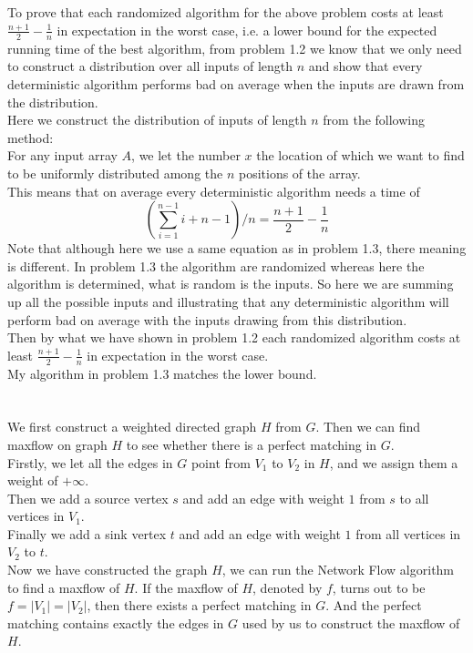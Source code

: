 \documentclass[12pt,letterpaper]{article}
\begin{document}
\subsection{}
To prove that each randomized algorithm for the above problem
costs at least $\frac{n+1}{2}-\frac{1}{n}$ in expectation in the worst case, 
i.e. a lower bound for the expected running time of the best algorithm,
from problem 1.2 we know that we only need to construct a distribution 
over all inputs of length $n$ and show that every deterministic 
algorithm performs bad on average when the inputs are drawn from the distribution.\\
Here we construct the distribution of inputs of length $n$ from the following method:\\
For any input array $A$, 
we let the number $x$ the location of which we want to find to 
be uniformly distributed among the $n$ positions of the array.\\
This means that on average every deterministic algorithm needs 
a time of 
$$\left(\sum_{i=1}^{n-1}i+n-1\right)/n=\frac{n+1}{2}-\frac{1}{n}$$
Note that although here we use a same equation as in problem 1.3,
there meaning is different.
In problem 1.3 the algorithm are randomized whereas here the algorithm
is determined, what is random is the inputs.
So here we are summing up all the possible inputs and illustrating that 
any deterministic algorithm will perform bad on average 
with the inputs drawing from this distribution.\\
Then by what we have shown in problem 1.2 
each randomized algorithm costs at least $\frac{n+1}{2}-\frac{1}{n}$ 
in expectation in the worst case.\\
My algorithm in problem 1.3 matches the lower bound.


\newpage
\section{}
\subsection{}
We first construct a weighted directed graph $H$ from $G$.
Then we can find maxflow on graph $H$ to see whether there is a perfect matching in $G$.\\
Firstly, we let all the edges in $G$ point from $V_1$ to $V_2$ in $H$,
and we assign them a weight of $+\infty$.\\
Then we add a source vertex $s$ and 
add an edge with weight $1$ from $s$ to all vertices in $V_1$.\\
Finally we add a sink vertex $t$ and 
add an edge with weight $1$ from all vertices in $V_2$ to $t$.\\
Now we have constructed the graph $H$,
we can run the Network Flow algorithm to find a maxflow of $H$.
If the maxflow of $H$, denoted by $f$,
turns out to be $f=|V_1|=|V_2|$,
then there exists a perfect matching in $G$.
And the perfect matching contains exactly the edges in $G$ used 
by us to construct the maxflow of $H$.
\end{document}
